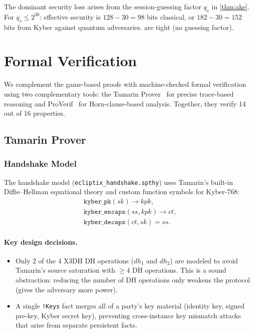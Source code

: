 \documentclass[11pt,a4paper]{article}
\theoremstyle{definition}
\begin{document}
The dominant security loss arises from the session-guessing factor $q_s$ in \cref{thm:ake}. For $q_s \leq 2^{30}$: effective security is $128 - 30 = 98$ bits classical, or $182 - 30 = 152$ bits from Kyber against quantum adversaries.  are tight (no guessing factor).


\section{Formal Verification}\label{sec:formal}

We complement the game-based proofs with machine-checked formal verification using two complementary tools: the Tamarin Prover~\cite{meier2013} for precise trace-based reasoning and ProVerif~\cite{blanchet2016} for Horn-clause-based analysis. Together, they verify 14 out of 16 properties.

\subsection{Tamarin Prover}\label{sec:tamarin}

\subsubsection{Handshake Model}

The handshake model (\texttt{ecliptix\_handshake.spthy}) uses Tamarin's built-in Diffie--Hellman equational theory and custom function symbols for Kyber-768:
\begin{align*}
  &\texttt{kyber\_pk}(sk) \to kpk, \\
  &\texttt{kyber\_encaps}(ss, kpk) \to ct, \\
  &\texttt{kyber\_decaps}(ct, sk) = ss.
\end{align*}

\paragraph{Key design decisions.}
\begin{itemize}
  \item Only 2 of the 4 X3DH DH operations ($\mathit{dh}_1$ and $\mathit{dh}_2$) are modeled to avoid Tamarin's source saturation with $\geq 4$ DH operations. This is a sound abstraction: reducing the number of DH operations only weakens the protocol (gives the adversary more power).

  \item A single \texttt{!Keys} fact merges all of a party's key material (identity key, signed pre-key, Kyber secret key), preventing cross-instance key mismatch attacks that arise from separate persistent facts.
\end{itemize}
\end{document}
